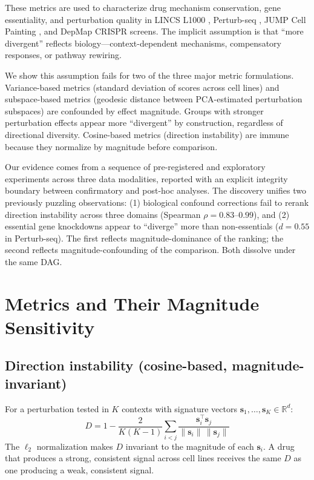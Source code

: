 \documentclass[11pt]{article}
\begin{document}
These metrics are used to characterize drug mechanism conservation, gene
essentiality, and perturbation quality in LINCS L1000
\citep{subramanian2017next}, Perturb-seq \citep{replogle2022mapping},
JUMP Cell Painting \citep{chandrasekaran2023jump}, and DepMap CRISPR
screens. The implicit assumption is that ``more divergent'' reflects
biology---context-dependent mechanisms, compensatory responses, or
pathway rewiring.

We show this assumption fails for two of the three major metric
formulations. Variance-based metrics (standard deviation of scores
across cell lines) and subspace-based metrics (geodesic distance between
PCA-estimated perturbation subspaces) are confounded by effect
magnitude. Groups with stronger perturbation effects appear more
``divergent'' by construction, regardless of directional diversity.
Cosine-based metrics (direction instability) are immune because they
normalize by magnitude before comparison.

Our evidence comes from a sequence of pre-registered and exploratory
experiments across three data modalities, reported with an explicit
integrity boundary between confirmatory and post-hoc analyses. The
discovery unifies two previously puzzling observations: (1) biological
confound corrections fail to rerank direction instability across three
domains (Spearman $\rho = 0.83$--$0.99$), and (2) essential gene
knockdowns appear to ``diverge'' more than non-essentials ($d = 0.55$ in
Perturb-seq). The first reflects magnitude-dominance of the ranking; the
second reflects magnitude-confounding of the comparison. Both dissolve
under the same DAG.

\section{Metrics and Their Magnitude Sensitivity}

\subsection{Direction instability (cosine-based, magnitude-invariant)}

For a perturbation tested in $K$ contexts with signature vectors
$\mathbf{s}_1, \ldots, \mathbf{s}_K \in \mathbb{R}^d$:
\begin{equation}
  D = 1 - \frac{2}{K(K-1)} \sum_{i < j}
    \frac{\mathbf{s}_i^\top \mathbf{s}_j}
         {\|\mathbf{s}_i\| \, \|\mathbf{s}_j\|}
\end{equation}
The $\ell_2$ normalization makes $D$ invariant to the magnitude of each
$\mathbf{s}_i$. A drug that produces a strong, consistent signal across
cell lines receives the same $D$ as one producing a weak, consistent
signal.
\end{document}
